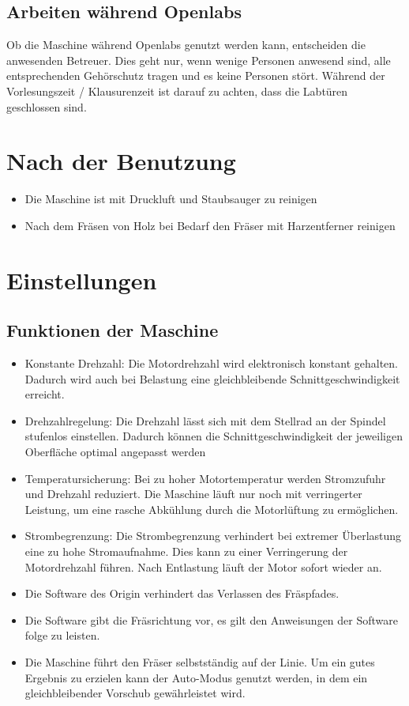 \documentclass{\basedir/fablab-document}
\begin{document}
\subsection{Arbeiten während Openlabs}
Ob die Maschine während Openlabs genutzt werden kann, entscheiden die anwesenden
Betreuer. Dies geht nur, wenn wenige Personen anwesend sind, alle
entsprechenden Gehörschutz tragen und es keine Personen stört.
Während der Vorlesungszeit / Klausurenzeit ist darauf zu achten,
dass die Labtüren geschlossen sind.

\section{Nach der Benutzung}
\begin{itemize}
\item Die Maschine ist mit Druckluft und Staubsauger zu reinigen
\item Nach dem Fräsen von Holz bei Bedarf den Fräser mit Harzentferner reinigen
\end{itemize}

\section{Einstellungen}
\subsection{Funktionen der Maschine}
\begin{itemize}
    \item Konstante Drehzahl: Die Motordrehzahl wird elektronisch konstant gehalten.
        Dadurch wird auch bei Belastung eine gleichbleibende Schnittgeschwindigkeit erreicht.
    \item Drehzahlregelung: Die Drehzahl lässt sich mit dem Stellrad an der Spindel
        stufenlos einstellen. Dadurch können die Schnittgeschwindigkeit der jeweiligen
        Oberfläche optimal angepasst werden
    \item Temperatursicherung: Bei zu hoher Motortemperatur werden Stromzufuhr
        und Drehzahl reduziert. Die Maschine läuft nur noch mit verringerter
        Leistung, um eine rasche Abkühlung durch die Motorlüftung zu ermöglichen.
    \item Strombegrenzung: Die Strombegrenzung verhindert bei extremer Überlastung
        eine zu hohe Stromaufnahme. Dies kann zu einer Verringerung der Motordrehzahl
        führen. Nach Entlastung läuft der Motor sofort wieder an.
    \item Die Software des Origin verhindert das Verlassen des Fräspfades.
    \item Die Software gibt die Fräsrichtung vor, es gilt den Anweisungen der Software folge zu leisten.
    \item Die Maschine führt den Fräser selbstständig auf der Linie. Um ein
        gutes Ergebnis zu erzielen kann der Auto-Modus genutzt werden, in dem ein
        gleichbleibender Vorschub gewährleistet wird.
\end{itemize}
\end{document}
